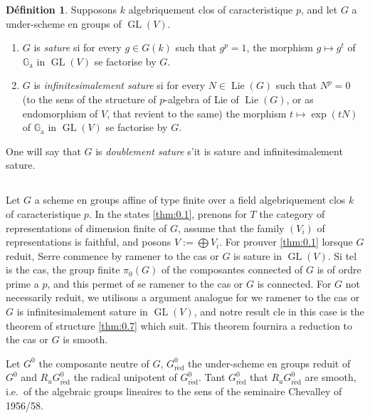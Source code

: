 \documentclass[11pt,a4paper]{article}
\theoremstyle{plain}
\theoremstyle{definition}
\newtheorem{definition}[theorem]{D\'efinition}
\DeclareMathOperator{\Lie}{Lie}
\DeclareMathOperator{\GL}{GL}
\newcommand{\Ga}{\mathbb{G}_\mathrm{a}}
\newcommand{\red}{\mathrm{r\acute{e}d}}
\begin{document}
\begin{definition}\label{def:0.5}
Supposons $k$ algebriquement clos of caracteristique $p$, and let $G$ a under-scheme en groups of $\GL(V)$.
\begin{enumerate}[label=(\roman*)]
\item $G$ is \emph{sature} si for every $g \in G(k)$ such that $g^p = 1$, the morphism $g \mapsto g^t$ of $\Ga$ in $\GL(V)$ se factorise by $G$.
\item $G$ is \emph{infinitesimalement sature} si for every $N \in \Lie(G)$ such that $N^p = 0$ (to the sens of the structure of $p$-algebra of Lie of $\Lie(G)$, or as endomorphism of $V$, that revient to the same) the morphism $t \mapsto \exp(tN)$ of $\Ga$ in $\GL(V)$ se factorise by $G$.
\end{enumerate}
One will say that $G$ is \emph{doublement sature} s'it is sature and infinitesimalement sature.
\end{definition}

\subsection{}
Let $G$ a scheme en groups affine of type finite over a field algebriquement clos $k$ of caracteristique $p$. In the states \ref{thm:0.1}, prenons for $T$ the category of representations of dimension finite of $G$, assume that the family $(V_i)$ of representations is faithful, and posons $V := \bigoplus V_i$. For prouver \ref{thm:0.1} lorsque $G$ reduit, Serre \cite{Serre1994} commence by ramener to the cas or $G$ is sature in $\GL(V)$. Si tel is the cas, the group finite $\pi_0(G)$ of the composantes connected of $G$ is of ordre prime a $p$, and this permet of se ramener to the cas or $G$ is connected. For $G$ not necessarily reduit, we utilisons a argument analogue for we ramener to the cas or $G$ is infinitesimalement sature in $\GL(V)$, and notre result cle in this case is the theorem of structure \ref{thm:0.7} which suit. This theorem fournira a reduction to the cas or $G$ is smooth.

Let $G^0$ the composante neutre of $G$, $G^0_\red$ the under-scheme en groups reduit of $G^0$ and $R_u G^0_\red$ the radical unipotent of $G^0_\red$. Tant $G^0_\red$ that $R_u G^0_\red$ are smooth, i.e.\ of the algebraic groups lineaires to the sens of the seminaire Chevalley of 1956/58.
\end{document}
